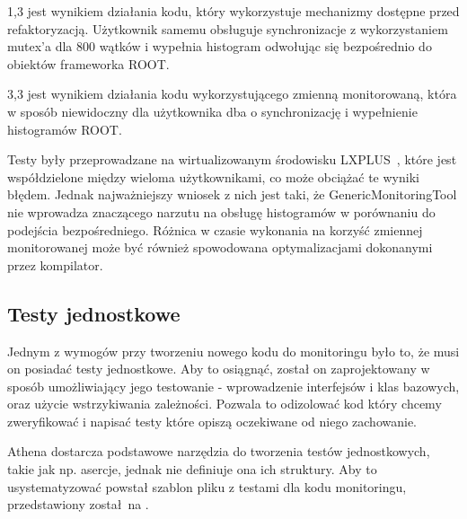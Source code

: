 1,3 jest wynikiem działania kodu, który wykorzystuje mechanizmy dostępne przed refaktoryzacją.
Użytkownik samemu obsługuje synchronizacje z wykorzystaniem mutex'a dla 800 wątków i wypełnia histogram odwołując się bezpośrednio do obiektów frameworka ROOT.

3,3 jest wynikiem działania kodu wykorzystującego zmienną monitorowaną, która w sposób niewidoczny dla użytkownika dba o synchronizację i wypełnienie histogramów ROOT. 

Testy były przeprowadzane na wirtualizowanym środowisku LXPLUS~\cite{cern-lxplus}, które jest współdzielone między wieloma użytkownikami, co może obciążać te wyniki błędem. 
Jednak najważniejszy wniosek z nich jest taki, że GenericMonitoringTool nie wprowadza znaczącego narzutu na obsługę histogramów w porównaniu do podejścia bezpośredniego.
Różnica w czasie wykonania na korzyść zmiennej monitorowanej może być również spowodowana optymalizacjami dokonanymi przez kompilator. 

\subsection{Testy jednostkowe}
Jednym z wymogów przy tworzeniu nowego kodu do monitoringu było to, że musi on posiadać testy jednostkowe.
Aby to osiągnąć, został on zaprojektowany w sposób umożliwiający jego testowanie - wprowadzenie interfejsów i klas bazowych, oraz użycie wstrzykiwania zależności.
Pozwala to odizolować kod który chcemy zweryfikować i napisać testy które opiszą oczekiwane od niego zachowanie.

Athena dostarcza podstawowe narzędzia do tworzenia testów jednostkowych, takie jak np. asercje, jednak nie definiuje ona ich struktury.
Aby to usystematyzować powstał szablon pliku z testami dla kodu monitoringu, przedstawiony został na .



